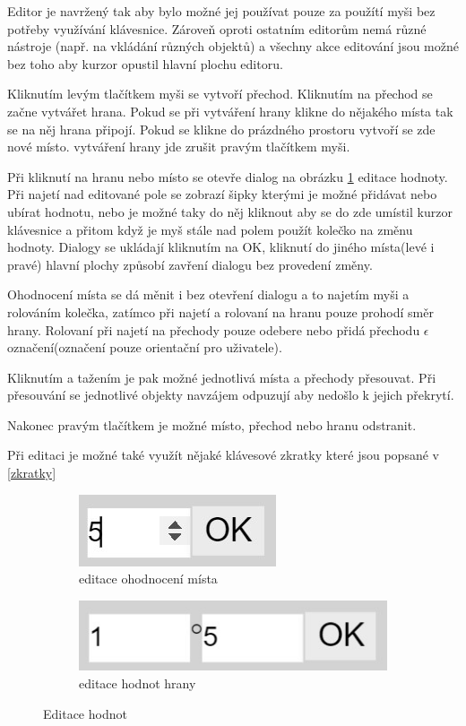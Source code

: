 \documentclass[
  biblatex,
  glossaries,
  index
]{kidiplom}
\begin{document}
Editor je navržený tak aby bylo možné jej používat pouze za použítí 
myši bez potřeby využívání klávesnice. Zároveň oproti ostatním editorům
nemá různé nástroje (např. na vkládání různých objektů) a všechny 
akce editování jsou možné bez toho aby kurzor opustil hlavní plochu editoru.

Kliknutím levým tlačítkem myši se vytvoří přechod. 
Kliknutím na přechod se začne vytvářet hrana. Pokud se při 
vytváření hrany klikne do nějakého místa tak se na něj hrana 
připojí. Pokud se klikne do prázdného prostoru vytvoří se zde nové místo.
vytváření hrany jde zrušit pravým tlačítkem myši.

Při kliknutí na hranu nebo místo se otevře dialog na obrázku \ref{fig:editace hodnot} editace hodnoty.
Při najetí nad editované pole se zobrazí šipky kterými 
je možné přidávat nebo ubírat hodnotu, nebo je možné taky 
do něj kliknout aby se do zde umístil kurzor klávesnice a 
přitom když je myš stále nad polem použít kolečko na změnu hodnoty.
Dialogy se ukládají kliknutím na OK, kliknutí do jiného místa(levé i pravé) 
hlavní plochy způsobí zavření dialogu bez provedení změny.

Ohodnocení místa se dá měnit i bez otevření dialogu a to najetím myši
a rolováním kolečka, zatímco při najetí a rolovaní na hranu pouze prohodí směr
hrany. Rolovaní při najetí na přechody pouze odebere nebo přidá přechodu 
$\epsilon$ označení(označení pouze orientační pro uživatele).

Kliknutím a tažením je pak možné jednotlivá místa a přechody přesouvat.
Při přesouvání se jednotlivé objekty navzájem odpuzují aby nedošlo k jejich překrytí.

Nakonec pravým tlačítkem je možné místo, přechod nebo hranu odstranit.

Při editaci je možné také využít nějaké klávesové zkratky které jsou popsané v \ref{zkratky}

\begin{figure}[h]
  \centering
  \begin{subfigure}[h]{0,4\linewidth}
    \includegraphics{dialog_place}
    \caption{editace ohodnocení místa}
  \end{subfigure}
  \begin{subfigure}[h]{0,4\linewidth}
    \includegraphics[width=\linewidth]{dialog_arc}
    \caption{editace hodnot hrany}
  \end{subfigure}
  \caption{Editace hodnot}
  \label{fig:editace hodnot}
\end{figure}
\end{document}
